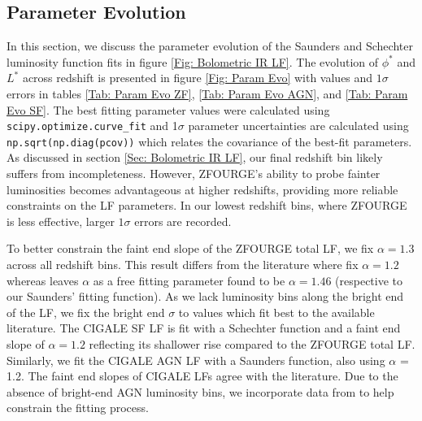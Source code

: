 \subsection{Parameter Evolution} \label{Sec: Parameter Evolution}
In this section, we discuss the parameter evolution of the Saunders and Schechter luminosity function fits in figure \ref{Fig: Bolometric IR LF}. The evolution of $\phi^{*}$ and $L^{*}$ across redshift is presented in figure \ref{Fig: Param Evo} with values and $1\sigma$ errors in tables \ref{Tab: Param Evo ZF}, \ref{Tab: Param Evo AGN}, and \ref{Tab: Param Evo SF}. The best fitting parameter values were calculated using \texttt{scipy.optimize.curve\_fit} \citep{virtanen_scipy_2020} and 1$\sigma$ parameter uncertainties are calculated using \texttt{np.sqrt(np.diag(pcov))} \citep{harris_array_2020} which relates the covariance of the best-fit parameters. As discussed in section \ref{Sec: Bolometric IR LF}, our final redshift bin likely suffers from incompleteness. However, ZFOURGE's ability to probe fainter luminosities becomes advantageous at higher redshifts, providing more reliable constraints on the LF parameters. In our lowest redshift bins, where ZFOURGE is less effective, larger $1\sigma$ errors are recorded.

To better constrain the faint end slope of the ZFOURGE total LF, we fix $\alpha=1.3$ across all redshift bins. This result differs from the literature where \cite{rodighiero_mid-_2010, gruppioni_herschel_2013} fix $\alpha=1.2$ whereas \cite{fu_decomposing_2010} leaves $\alpha$ as a free fitting parameter found to be $\alpha=1.46$ (respective to our Saunders' fitting function). As we lack luminosity bins along the bright end of the LF, we fix the bright end $\sigma$ to values which fit best to the available literature. The CIGALE SF LF is fit with a Schechter function and a faint end slope of $\alpha=1.2$ reflecting its shallower rise compared to the ZFOURGE total LF. Similarly, we fit the CIGALE AGN LF with a Saunders function, also using $\alpha$ = 1.2. The faint end slopes of CIGALE LFs agree with the literature. Due to the absence of bright-end AGN luminosity bins, we incorporate data from \cite{thorne_deep_2022} to help constrain the fitting process.

